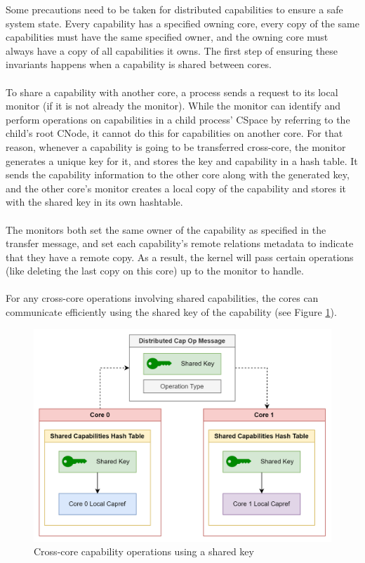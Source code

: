 Some precautions need to be taken for distributed capabilities to ensure a safe system state. Every capability has a specified owning core, every copy of the same capabilities must have the same specified owner, and the owning core must always have a copy of all capabilities it owns. The first step of ensuring these invariants happens when a capability is shared between cores.
\\\\
To share a capability with another core, a process sends a request to its local monitor (if it is not already the monitor). While the monitor can identify and perform operations on capabilities in a child process' CSpace by referring to the child's root CNode, it cannot do this for capabilities on another core. For that reason, whenever a capability is going to be transferred cross-core, the monitor generates a unique key for it, and stores the key and capability in a hash table. It sends the capability information to the other core along with the generated key, and the other core's monitor creates a local copy of the capability and stores it with the shared key in its own hashtable.
\\\\
The monitors both set the same owner of the capability as specified in the transfer message, and set each capability's remote relations metadata to indicate that they have a remote copy. As a result, the kernel will pass certain operations (like deleting the last copy on this core) up to the monitor to handle.
\\\\
For any cross-core operations involving shared capabilities, the cores can communicate efficiently using the shared key of the capability (see Figure \ref{figure:m7_shared_key}).

\begin{figure}[ht]
    \centering
    \includegraphics[width=0.8\columnwidth]{images/capability_ops.png}
    \caption{Cross-core capability operations using a shared key}
    \label{figure:m7_shared_key}
\end{figure}

